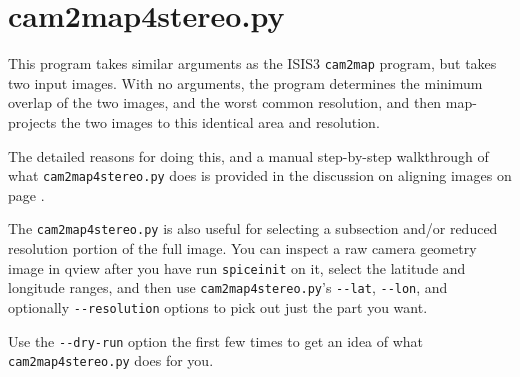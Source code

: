 \clearpage

\section{cam2map4stereo.py}
\label{cam2map4stereo}

This program takes similar arguments as the ISIS3 \texttt{cam2map} program,
but takes two input images.  With no arguments, the program determines
the minimum overlap of the two images, and the worst common resolution,
and then map-projects the two images to this identical area and resolution.

The detailed reasons for doing this, and a manual step-by-step walkthrough of
what \texttt{cam2map4stereo.py} does is provided in the discussion on aligning images on page \pageref{sec:AligningImages}.

The \texttt{cam2map4stereo.py} is also useful for selecting a subsection and/or reduced resolution portion of the full image.  You can inspect a raw camera geometry image in qview after you have run \texttt{spiceinit} on it, select the latitude and longitude ranges, and then use \texttt{cam2map4stereo.py}'s \texttt{-\/-lat}, \texttt{-\/-lon}, and optionally \texttt{-\/-resolution} options to pick out just the part you want.

Use the \texttt{-\/-dry-run} option the first few times to get an idea of what \texttt{cam2map4stereo.py} does for you.

